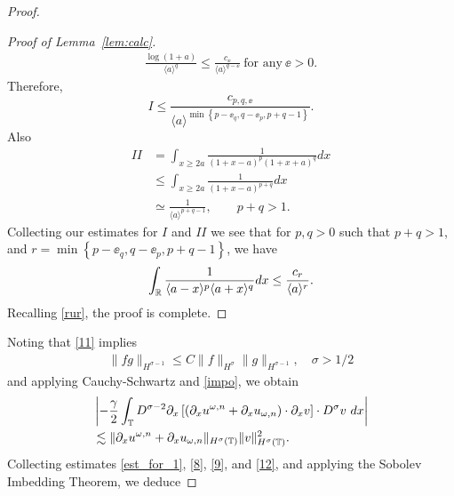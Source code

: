 \begin{proof}
\begin{proof}[Proof of Lemma~\ref{lem:calc}]
\begin{equation*}
\begin{split}
\frac{\log(1 + a)}{\langle a \rangle^{q} } \le  \frac{c_{\ee}}{\langle a
\rangle ^{q - \ee}} \ \text{for any} \ \ee > 0.
\end{split}
\end{equation*}
%
%
%
Therefore,
\begin{equation*}
I \le  \frac{c_{p,q, \ee}}{\langle a \rangle ^{\min\left\{ p-\ee_{q}, q -\ee_{p}, p + q-1 \right\}}}.
\end{equation*}
%
%
Also
%
%
\begin{equation*}
\begin{split}
II 
& = \int_{x \ge 2a} \frac{1}{(1 + x - a)^{p} (1 + x +
a)^{q}} d x
\\
& \le \int_{x \ge 2a} \frac{1}{(1 + x -a)^{p+q}} d x
\\
& \simeq \frac{1}{\langle a \rangle^{p+q -1}}, \qquad p + q > 1.
\end{split}
\end{equation*}
%
%
Collecting our estimates for $I$ and $II$ we see that for 
$p, q > 0$ such that $p +q >1$, and $r =\min\left\{p -\ee_{q}, q - \ee_{p}, p+q-1
\right\}$, we have
\begin{align*}
\int_{\mathbb{R}} \frac{1}{\langle a - x \rangle ^{p} \langle a + x \rangle
^{q}} d x
\le \frac{c_{r}}{\langle a \rangle ^{r}}.
\label{est-2}
\end{align*}
Recalling \eqref{rur}, the proof is complete.
\end{proof}
%
%
Noting that \eqref{11} implies
%
%
%
\begin{equation}
\label{impo}
\begin{split}
\|fg\|_{H^{\sigma - 1}} \le C \|f\|_{H^{\sigma}}
\|g\|_{H^{\sigma -1}}, \quad \sigma > 1/2
\end{split}
\end{equation}
%
%
%
and applying Cauchy-Schwartz and  \eqref{impo}, we obtain
%
%
\begin{equation}
\begin{split}
& \left | -\frac{\gamma}{2} \int_{\mathbb{T}} D^{\sigma -2 } \partial_x \left[
\left( \partial_x u^{\omega,n} + \partial_x u_{\omega,n} \right) \cdot \partial_x v
\right] \cdot D^\sigma v \ dx \right |
\\
& \lesssim \|\partial_x u^{\omega,n} + \partial_x u_{\omega,n}
\|_{H^\sigma(\mathbb{T})} \|v\|_{H^\sigma(\mathbb{T})}^2.
\label{12}
\end{split}
\end{equation}
%
%
Collecting estimates \eqref{est_for_1}, \eqref{8}, \eqref{9}, and
\eqref{12}, and applying the Sobolev Imbedding Theorem, we deduce

\end{proof}
